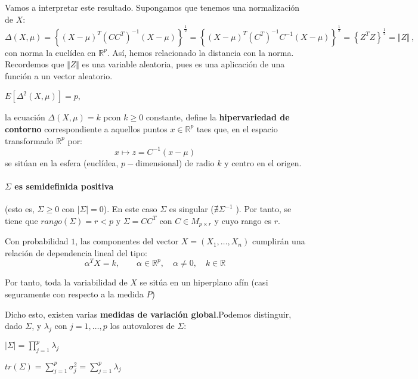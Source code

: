   Vamos a interpretar este resultado. Supongamos que tenemos una normalización de $X$:
  \[
  \Delta(X,\mu) = \left\{ (X-\mu)^T (CC^T)^{-1}(X-\mu)\right\}^{\frac{1}{2}} = \left\{ (X-\mu)^T (C^T)^{-1}C^{-1}(X-\mu)\right\}^{\frac{1}{2}} = \left\{Z^T Z\right\}^{\frac{1}{2}} = \Vert Z\Vert\,,
  \]
  con norma la euclídea en $\mathbb R^p$. Así, hemos relacionado la distancia con la norma. Recordemos que $\Vert Z\Vert$ es una variable aleatoria, pues es una aplicación de una función a un vector aleatorio.

  \begin{nprop}\hfill
    \begin{nlist}
    \item $E[\Delta^2 (X,\mu)] = p$,
    \item la ecuación $\Delta(X,\mu) = k$ pcon $k\geq 0$ constante, define la \textbf{hipervariedad de contorno} correspondiente a aquellos puntos $x \in \mathbb R^p$ taes que, en el espacio transformado $\mathbb R^p$ por:
      \[
      x \mapsto z = C^{-1}(x-\mu)
      \]
      se sitúan en la esfera (euclídea, $p-$dimensional) de radio $k$ y centro en el origen.
    \end{nlist}

  \end{nprop}

\paragraph{$\Sigma$ es \textbf{semidefinida positiva}} (esto es, $\Sigma \geq 0$ con $|\Sigma| = 0$).  En este caso $\Sigma$ es singular ($\nexists \Sigma ^{-1} $ ). Por tanto, se tiene que $rango(\Sigma) = r < p$ y $\Sigma = C C^T$ con $C \in M_{p\times r}$ y cuyo rango es $r$.\\

  \begin{ncor}
    Con probabilidad $1$, las componentes del vector $X = (X_1, \dots, X_n)$ cumplirán una relación de dependencia lineal del tipo:
    \[
    \alpha^T X = k, \quad \quad \alpha \in \mathbb R^p, \quad \alpha \ne 0 , \quad k \in \mathbb R
    \]
    
  Por tanto, toda la variabilidad de $X$ se sitúa en un hiperplano afín (casi seguramente con respecto a la medida $P$)
  \end{ncor}

Dicho esto, existen varias \textbf{medidas de variación global}.Podemos distinguir, dado $\Sigma$, y $\lambda_j$ con $j = 1,\dots,p$ los autovalores de $\Sigma$:
\begin{nlist}
\item $|\Sigma| =  \prod_{j=1}^p \lambda_j$
  \item $tr(\Sigma) = \sum_{j = 1}^p \sigma_j^2 = \sum_{j=1}^p \lambda_j$
\end{nlist}


